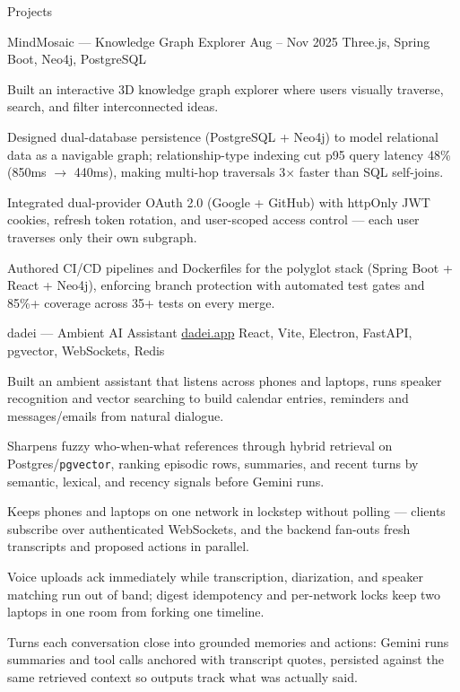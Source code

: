 \documentclass[
	11pt
]{../../resume}
\begin{document}
	\begin{rSection}{P}{rojects}
		\begin{rSectionEntry}
			{MindMosaic --- Knowledge Graph Explorer}
			{Aug -- Nov 2025}
			{}
			{Three.js, Spring Boot, Neo4j, PostgreSQL}
			{}

			\item Built an interactive 3D knowledge graph explorer where users visually traverse, search, and filter interconnected ideas.
			\item Designed dual-database persistence (PostgreSQL + Neo4j) to model relational data as a navigable graph; relationship-type indexing cut p95 query latency 48\% (850ms $\rightarrow$ 440ms), making multi-hop traversals 3$\times$ faster than SQL self-joins.
			\item Integrated dual-provider OAuth 2.0 (Google + GitHub) with httpOnly JWT cookies, refresh token rotation, and user-scoped access control --- each user traverses only their own subgraph.
			\item Authored CI/CD pipelines and Dockerfiles for the polyglot stack (Spring Boot + React + Neo4j), enforcing branch protection with automated test gates and 85\%+ coverage across 35+ tests on every merge.
		\end{rSectionEntry}

		\begin{rSectionEntry}
			{dadei --- Ambient AI Assistant}
			{\href{https://dadei.app}{dadei.app}}
			{}
			{React, Vite, Electron, FastAPI, pgvector, WebSockets, Redis}
			{}

			\item Built an ambient assistant that listens across phones and laptops, runs speaker recognition and vector searching to build calendar entries, reminders and messages/emails from natural dialogue.
			\item Sharpens fuzzy who-when-what references through hybrid retrieval on Postgres/\texttt{pgvector}, ranking episodic rows, summaries, and recent turns by semantic, lexical, and recency signals before Gemini runs.
			\item Keeps phones and laptops on one network in lockstep without polling --- clients subscribe over authenticated WebSockets, and the backend fan-outs fresh transcripts and proposed actions in parallel.
			\item Voice uploads ack immediately while transcription, diarization, and speaker matching run out of band; digest idempotency and per-network locks keep two laptops in one room from forking one timeline.
			\item Turns each conversation close into grounded memories and actions: Gemini runs summaries and tool calls anchored with transcript quotes, persisted against the same retrieved context so outputs track what was actually said.		\end{rSectionEntry}


\end{rSection}
\end{document}
